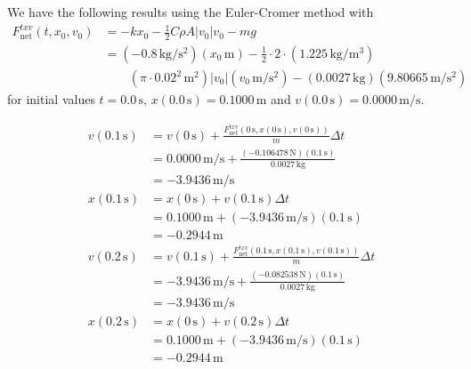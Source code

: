 We have the following results using the Euler-Cromer method with
\begin{equation*}
    \begin{split}
        F_{\text{net}}^{txv}(t, x_0, v_0) &= -kx_0 - \frac{1}{2}C\rho A \lvert v_0 \rvert v_0 - mg \\
        &= (-0.8\,\text{kg}/\text{s}^2)(x_0\,\text{m}) 
            - \frac{1}{2} \cdot 2 \cdot (1.225\,\text{kg}/\text{m}^3) \\
        &\qquad (\pi \cdot {0.02}^2\,\text{m}^2)\lvert v_0 \rvert (v_0\,\text{m}/\text{s}^2) 
            - (0.0027\,\text{kg})(9.80665\,\text{m}/\text{s}^2)
    \end{split}
\end{equation*}
for initial values $t = 0.0\,\text{s}$, $x(0.0\,\text{s}) = 0.1000\,\text{m}$ and 
$v(0.0\,\text{s}) = 0.0000\,\text{m/s}$.

\begin{equation*}
    \begin{split}
        v(0.1\,\text{s}) &= v(0\,\text{s}) 
            + \frac{F_{\text{net}}^{txv}(0\,\text{s}, x(0\,\text{s}), v(0\,\text{s}))}{m}\Delta t \\
                         &= 0.0000\,\text{m/s} 
            + \frac{(-0.106478\,\text{N})(0.1\,\text{s})}{0.0027\,\text{kg}} \\
                         &= -3.9436\,\text{m/s} \\
        x(0.1\,\text{s}) &= x(0\,\text{s}) + v(0.1\,\text{s}) \Delta t \\
                         &= 0.1000\,\text{m} + (-3.9436\,\text{m/s})(0.1\,\text{s}) \\
                         &= -0.2944\,\text{m} \\
        v(0.2\,\text{s}) &= v(0.1\,\text{s}) 
            + \frac{F_{\text{net}}^{txv}(0.1\,\text{s}, x(0.1\,\text{s}), v(0.1\,\text{s}))}{m}\Delta t \\
                         &= -3.9436\,\text{m/s} 
            + \frac{(-0.082538\,\text{N})(0.1\,\text{s})}{0.0027\,\text{kg}} \\
                         &= -3.9436\,\text{m/s} \\
        x(0.2\,\text{s}) &= x(0\,\text{s}) + v(0.2\,\text{s}) \Delta t \\
                         &= 0.1000\,\text{m} + (-3.9436\,\text{m/s})(0.1\,\text{s}) \\
                         &= -0.2944\,\text{m} \\
    \end{split}
\end{equation*}
